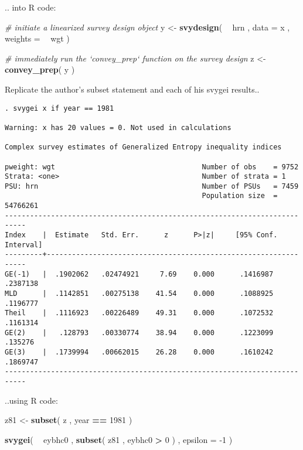 \documentclass[]{book}
\newenvironment{Shaded}{\begin{snugshade}}{\end{snugshade}}
\newcommand{\CommentTok}[1]{\textcolor[rgb]{0.56,0.35,0.01}{\textit{#1}}}
\newcommand{\DataTypeTok}[1]{\textcolor[rgb]{0.13,0.29,0.53}{#1}}
\newcommand{\DecValTok}[1]{\textcolor[rgb]{0.00,0.00,0.81}{#1}}
\newcommand{\KeywordTok}[1]{\textcolor[rgb]{0.13,0.29,0.53}{\textbf{#1}}}
\newcommand{\NormalTok}[1]{#1}
\newcommand{\OperatorTok}[1]{\textcolor[rgb]{0.81,0.36,0.00}{\textbf{#1}}}
\newcommand{\StringTok}[1]{\textcolor[rgb]{0.31,0.60,0.02}{#1}}
\begin{document}
.. into R code:

\begin{Shaded}
\begin{Highlighting}[]
\CommentTok{# initiate a linearized survey design object}
\NormalTok{y <-}\StringTok{ }\KeywordTok{svydesign}\NormalTok{( }\OperatorTok{~}\StringTok{ }\NormalTok{hrn , }\DataTypeTok{data =}\NormalTok{ x , }\DataTypeTok{weights =} \OperatorTok{~}\StringTok{ }\NormalTok{wgt )}

\CommentTok{# immediately run the `convey_prep` function on the survey design}
\NormalTok{z <-}\StringTok{ }\KeywordTok{convey_prep}\NormalTok{( y )}
\end{Highlighting}
\end{Shaded}

Replicate the author's subset statement and each of his svygei results..

\begin{verbatim}
. svygei x if year == 1981
 
Warning: x has 20 values = 0. Not used in calculations

Complex survey estimates of Generalized Entropy inequality indices
 
pweight: wgt                                   Number of obs    = 9752
Strata: <one>                                  Number of strata = 1
PSU: hrn                                       Number of PSUs   = 7459
                                               Population size  = 54766261
---------------------------------------------------------------------------
Index    |  Estimate   Std. Err.      z      P>|z|     [95% Conf. Interval]
---------+-----------------------------------------------------------------
GE(-1)   |  .1902062   .02474921     7.69    0.000      .1416987   .2387138
MLD      |  .1142851   .00275138    41.54    0.000      .1088925   .1196777
Theil    |  .1116923   .00226489    49.31    0.000      .1072532   .1161314
GE(2)    |   .128793   .00330774    38.94    0.000      .1223099    .135276
GE(3)    |  .1739994   .00662015    26.28    0.000      .1610242   .1869747
---------------------------------------------------------------------------
\end{verbatim}

..using R code:

\begin{Shaded}
\begin{Highlighting}[]
\NormalTok{z81 <-}\StringTok{ }\KeywordTok{subset}\NormalTok{( z , year }\OperatorTok{==}\StringTok{ }\DecValTok{1981}\NormalTok{ )}

\KeywordTok{svygei}\NormalTok{( }\OperatorTok{~}\StringTok{ }\NormalTok{eybhc0 , }\KeywordTok{subset}\NormalTok{( z81 , eybhc0 }\OperatorTok{>}\StringTok{ }\DecValTok{0}\NormalTok{ ) , }\DataTypeTok{epsilon =} \DecValTok{-1}\NormalTok{ )}
\end{Highlighting}
\end{Shaded}
\end{document}

